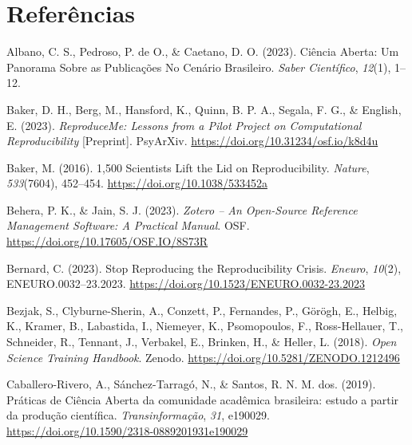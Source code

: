 \documentclass[
  a4paper,
]{book}
\newlength{\cslhangindent}
\newenvironment{CSLReferences}[2] %
 {\begin{list}{}{%
  \setlength{\itemindent}{0pt}
  \setlength{\leftmargin}{0pt}
  \setlength{\parsep}{0pt}
  \ifodd #1
   \setlength{\leftmargin}{\cslhangindent}
   \setlength{\itemindent}{-1\cslhangindent}
  \fi
  \setlength{\itemsep}{#2\baselineskip}}}
 {\end{list}}
\begin{document}

\chapter*{Referências}\label{referuxeancias}


\label{refs}
\begin{CSLReferences}{1}{0}
Albano, C. S., Pedroso, P. de O., \& Caetano, D. O. (2023). Ci{ê}ncia
{Aberta}: {Um Panorama} Sobre as {Publica{ç}{õ}es} No {Cen{á}rio
Brasileiro}. \emph{Saber Cient{í}fico}, \emph{12}(1), 1--12.

Baker, D. H., Berg, M., Hansford, K., Quinn, B. P. A., Segala, F. G., \&
English, E. (2023). \emph{{ReproduceMe}: Lessons from a Pilot Project on
Computational Reproducibility} {[}Preprint{]}. PsyArXiv.
\url{https://doi.org/10.31234/osf.io/k8d4u}

Baker, M. (2016). 1,500 Scientists Lift the Lid on Reproducibility.
\emph{Nature}, \emph{533}(7604), 452--454.
\url{https://doi.org/10.1038/533452a}

Behera, P. K., \& Jain, S. J. (2023). \emph{Zotero -- An Open-Source
Reference Management Software: A Practical Manual}. OSF.
\url{https://doi.org/10.17605/OSF.IO/8S73R}

Bernard, C. (2023). Stop {Reproducing} the {Reproducibility Crisis}.
\emph{Eneuro}, \emph{10}(2), ENEURO.0032--23.2023.
\url{https://doi.org/10.1523/ENEURO.0032-23.2023}

Bezjak, S., Clyburne-Sherin, A., Conzett, P., Fernandes, P., Görögh, E.,
Helbig, K., Kramer, B., Labastida, I., Niemeyer, K., Psomopoulos, F.,
Ross-Hellauer, T., Schneider, R., Tennant, J., Verbakel, E., Brinken,
H., \& Heller, L. (2018). \emph{Open {Science Training Handbook}}.
Zenodo. \url{https://doi.org/10.5281/ZENODO.1212496}

Caballero-Rivero, A., Sánchez-Tarragó, N., \& Santos, R. N. M. dos.
(2019). {Pr{á}ticas de Ci{ê}ncia Aberta da comunidade acad{ê}mica
brasileira: estudo a partir da produ{ç}{ã}o cient{í}fica}.
\emph{Transinforma{ç}{ã}o}, \emph{31}, e190029.
\url{https://doi.org/10.1590/2318-0889201931e190029}


\end{CSLReferences}
\end{document}
